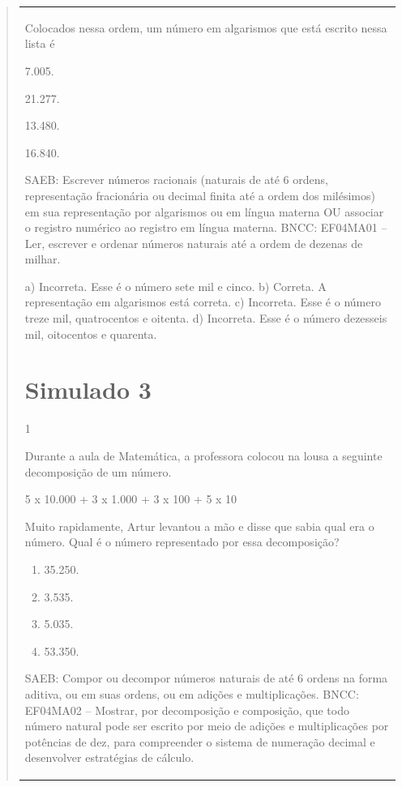 \begin{mdframed}[linewidth=2pt,linecolor=salmao,roundcorner=2pt]
\begin{itemize}
{\begin{itemize}
\begin{escolha}
{\begin{quote}
{\begin{escolha}
{{{{{\begin{longtable}[]{@{}l@{}}
\begin{itemize}
{Colocados nessa ordem, um número em algarismos que está escrito nessa lista é

\begin{escolha}
\item 7.005.
\item 21.277.
\item 13.480.
\item 16.840.
\end{escolha}

SAEB: Escrever números racionais (naturais de até 6 ordens, representação
fracionária ou decimal finita até a ordem dos milésimos) em sua
representação por algarismos ou em língua materna OU associar o registro
numérico ao registro em língua materna.
BNCC: EF04MA01 -- Ler, escrever e ordenar números naturais até a ordem de dezenas de milhar.

a) Incorreta. Esse é o número sete mil e cinco.
b) Correta. A representação em algarismos está correta.
c) Incorreta. Esse é o número treze mil, quatrocentos e oitenta.
d) Incorreta. Esse é o número dezesseis mil, oitocentos e quarenta.

\chapter{Simulado 3}
\markboth{Simulado 3}{}

\num{1}

Durante a aula de Matemática, a professora colocou na lousa a seguinte
decomposição de um número.

5 x 10.000 + 3 x 1.000 + 3 x 100 + 5 x 10

Muito rapidamente, Artur levantou a mão e disse que sabia qual era o
número. Qual é o número representado por essa decomposição?

\begin{enumerate}
\item
  35.250.
\item
  3.535.
\item
  5.035.
\item
  53.350.
\end{enumerate}

SAEB: Compor ou decompor números naturais de até 6 ordens na
forma aditiva, ou em suas ordens, ou em adições e multiplicações.
BNCC: EF04MA02 -- Mostrar, por decomposição e composição, que todo número natural pode ser escrito
por meio de adições e multiplicações por potências de dez, para compreender o sistema de
numeração decimal e desenvolver estratégias de cálculo.

}
\end{itemize}
\end{longtable}}}}}}
\end{escolha}}
\end{quote}}
\end{escolha}
\end{itemize}}
\end{itemize}
\end{mdframed}
